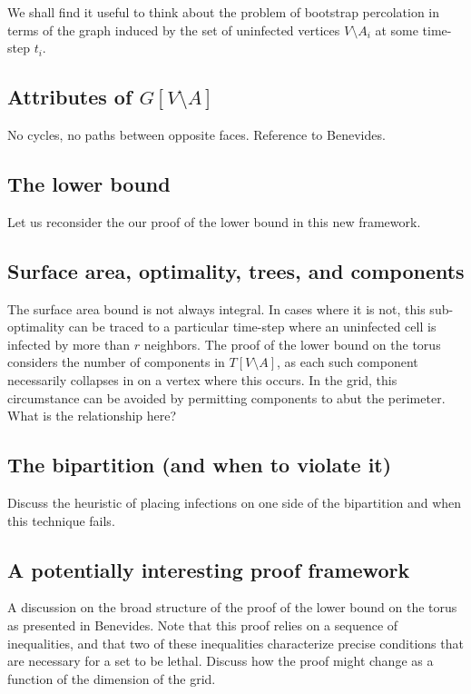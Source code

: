 We shall find it useful to think about the problem of bootstrap percolation in terms of the graph induced by the set of uninfected vertices $V \setminus A_i$ at some time-step $t_i$. 

\subsection{Attributes of $G[V \setminus A]$}

No cycles, no paths between opposite faces. Reference to Benevides.

\subsection{The lower bound}

Let us reconsider the our proof of the lower bound in this new framework. 

\subsection{Surface area, optimality, trees, and components}

The surface area bound is not always integral. In cases where it is not, this sub-optimality can be traced to a particular time-step where an uninfected cell is infected by more than $r$ neighbors. The proof of the lower bound on the torus considers the number of components in $T[V \setminus A]$, as each such component necessarily collapses in on a vertex where this occurs. In the grid, this circumstance can be avoided by permitting components to abut the perimeter. What is the relationship here?

\subsection{The bipartition (and when to violate it)}

Discuss the heuristic of placing infections on one side of the bipartition and when this technique fails. 

\subsection{A potentially interesting proof framework}

A discussion on the broad structure of the proof of the lower bound on the torus as presented in Benevides. Note that this proof relies on a sequence of inequalities, and that two of these inequalities characterize precise conditions that are necessary for a set to be lethal. Discuss how the proof might change as a function of the dimension of the grid. 
